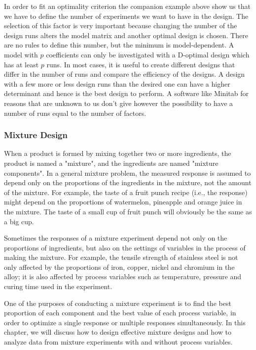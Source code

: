 	In order to fit an optimality criterion the companion example above show us that we have to define the number of experiments we want to have in the design. The selection of this factor is very important because changing the number of the design runs alters the model matrix and another optimal design is chosen. There are no rules to define this number, but the minimum is model-dependent. A model with $p$ coefficients can only be investigated with a D-optimal design which has at least $p$ runs. In most cases, it is useful to create different designs that differ in the number of runs and compare the efficiency of the designs. A design with a few more or less design runs than the desired one can have a higher determinant and hence is the best design to perform. A software like Minitab for reasons that are unknown to us don't give however the possibility  to have a number of runs equal to the number of factors.
	
	\pagebreak
	\subsubsection{Mixture Design}
	When a product is formed by mixing together two or more ingredients, the product is named a "mixture", and the ingredients are named "mixture components". In a general mixture problem, the measured response is assumed to depend only on the proportions of the ingredients in the mixture, not the amount of the mixture. For example, the taste of a fruit punch recipe (i.e., the response) might depend on the proportions of watermelon, pineapple and orange juice in the mixture. The taste of a small cup of fruit punch will obviously be the same as a big cup.
	
	Sometimes the responses of a mixture experiment depend not only on the proportions of ingredients, but also on the settings of variables in the process of making the mixture. For example, the tensile strength of stainless steel is not only affected by the proportions of iron, copper, nickel and chromium in the alloy; it is also affected by process variables such as temperature, pressure and curing time used in the experiment.

	One of the purposes of conducting a mixture experiment is to find the best proportion of each component and the best value of each process variable, in order to optimize a single response or multiple responses simultaneously. In this chapter, we will discuss how to design effective mixture designs and how to analyze data from mixture experiments with and without process variables.
	
